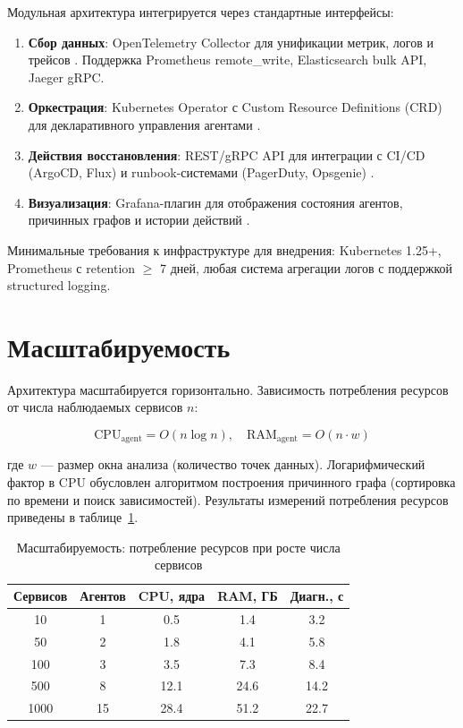 Модульная архитектура интегрируется через стандартные интерфейсы:

\begin{enumerate}
    \item \textbf{Сбор данных}: OpenTelemetry Collector для унификации метрик, логов и трейсов \cite{opentelemetry,opentelemetry_docs}. Поддержка Prometheus remote\_write, Elasticsearch bulk API, Jaeger gRPC.
    \item \textbf{Оркестрация}: Kubernetes Operator с Custom Resource Definitions (CRD) для декларативного управления агентами \cite{burns_kubernetes,kubernetes_docs}.
    \item \textbf{Действия восстановления}: REST/gRPC API для интеграции с CI/CD (ArgoCD, Flux) и runbook-системами (PagerDuty, Opsgenie) \cite{rfc_7540,grpc_design}.
    \item \textbf{Визуализация}: Grafana-плагин для отображения состояния агентов, причинных графов и истории действий \cite{grafana_docs}.
\end{enumerate}

Минимальные требования к инфраструктуре для внедрения: Kubernetes 1.25+, Prometheus с retention $\geq$ 7 дней, любая система агрегации логов с поддержкой structured logging.

\section{Масштабируемость}

Архитектура масштабируется горизонтально. Зависимость потребления ресурсов от числа наблюдаемых сервисов $n$:

\begin{equation}
\text{CPU}_{\text{agent}} = O(n \log n), \quad \text{RAM}_{\text{agent}} = O(n \cdot w)
\label{eq:scalability}
\end{equation}

где $w$ --- размер окна анализа (количество точек данных). Логарифмический фактор в CPU обусловлен алгоритмом построения причинного графа (сортировка по времени и поиск зависимостей). Результаты измерений потребления ресурсов приведены в таблице~\ref{tab:scalability}.

\begin{table}[H]
\centering
\caption{Масштабируемость: потребление ресурсов при росте числа сервисов}
\label{tab:scalability}
\setlength{\tabcolsep}{3pt}
\begin{tabular}{|c|c|c|c|c|}
\hline
\textbf{Сервисов} & \textbf{Агентов} & \textbf{CPU, ядра} & \textbf{RAM, ГБ} & \textbf{Диагн., с} \\
\hline
10 & 1 & 0.5 & 1.4 & 3.2 \\
\hline
50 & 2 & 1.8 & 4.1 & 5.8 \\
\hline
100 & 3 & 3.5 & 7.3 & 8.4 \\
\hline
500 & 8 & 12.1 & 24.6 & 14.2 \\
\hline
1000 & 15 & 28.4 & 51.2 & 22.7 \\
\hline
\end{tabular}
\end{table}

